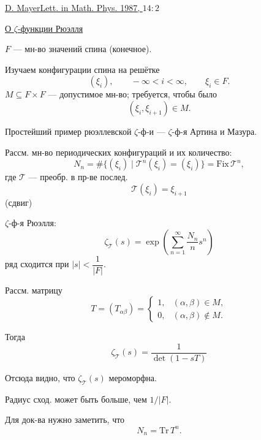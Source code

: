 \underline{D. Mayer}\qquad \underline{Lett. in Math. Phys. 1987, $14:2$}

\underline{О $\zeta$-функции Рюэлля}

$F$ — мн-во значений спина (конечное).

Изучаем конфигурации спина на решётке
\begin{equation*}
 (\xi_i),\qquad -\infty<i<\infty,\qquad \xi_i\in F.
\end{equation*}
$M\subseteq F\times F$ — допустимое мн-во; требуется, чтобы было
\begin{equation}
 (\xi_i,\xi_{i+1})\in M.
 \tag{1}
\end{equation}

Простейший пример рюэллевской $\zeta$-ф-и — $\zeta$-ф-я Артина и Мазура.

Рассм. мн-во периодических конфигураций и их количество:
\begin{equation}
 N_n=\#\{(\xi_i)\mid\mathcal T^n(\xi_i)=(\xi_i)\}
 =\mathrm{Fix}\,\mathcal T^n,
 \tag{2}
\end{equation}
где $\mathcal T$ — преобр. в пр-ве послед.
\begin{equation*}
 \mathcal T(\xi_i)=\xi_{i+1}
\end{equation*}
(сдвиг)

$\zeta$-ф-я Рюэлля:
\begin{equation}
 \zeta_{\mathcal T}(s)=\exp\left(\sum_{n=1}^{\infty}\frac{N_n}{n}s^n\right)
 \tag{3}
\end{equation}
ряд сходится при $|s|<\dfrac{1}{|F|}$.

Рассм. матрицу
\begin{equation}
 T=(T_{\alpha\beta})=
 \begin{cases}
 1,&(\alpha,\beta)\in M,\\
 0,&(\alpha,\beta)\notin M.
 \end{cases}
 \tag{4}
\end{equation}

Тогда
\begin{equation}
 \zeta_{\mathcal T}(s)=\frac{1}{\det(1-sT)}
 \tag{5}
\end{equation}

Отсюда видно, что $\zeta_{\mathcal T}(s)$ мероморфна.

Радиус сход. может быть больше, чем $1/|F|$.

Для док-ва нужно заметить, что
\begin{equation}
 N_n=\mathrm{Tr}\,T^n.
 \tag{6}
\end{equation}


